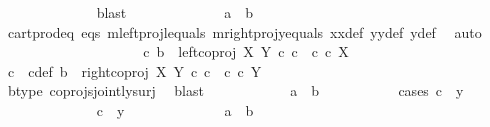 \begin{isabellebody}
\ \ \ \ \ \ \ \ \ \ \ \ \isamarkupfalse%
\ blast\isanewline
\ \ \ \ \ \ \ \ \ \ \isamarkupfalse%
\ \isamarkupfalse%
\ {\isachardoublequoteopen}a\ {\isacharequal}{\kern0pt}\ b{\isachardoublequoteclose}\isanewline
\ \ \ \ \ \ \ \ \ \ \ \ \isamarkupfalse%
\ cart{\isacharunderscore}{\kern0pt}prod{\isacharunderscore}{\kern0pt}eq{}\ eqs\ m{\isacharunderscore}{\kern0pt}leftproj{\isacharunderscore}{\kern0pt}l{\isacharunderscore}{\kern0pt}equals\ m{\isacharunderscore}{\kern0pt}rightproj{\isacharunderscore}{\kern0pt}y{\isacharunderscore}{\kern0pt}equals\ x{}x{}{\isacharunderscore}{\kern0pt}def{\isacharparenleft}{\kern0pt}{}{\isacharparenright}{\kern0pt}\ y{}y{}{\isacharunderscore}{\kern0pt}def\ y{\isacharunderscore}{\kern0pt}def\ \isamarkupfalse%
\ auto\isanewline
\ \ \ \ \ \ \ \ \isamarkupfalse%
\isanewline
\ \ \ \ \ \ \ \ \ \ \isamarkupfalse%
\ {\isachardoublequoteopen}{\isasymnexists}c{\isachardot}{\kern0pt}\ b\ {\isacharequal}{\kern0pt}\ left{\isacharunderscore}{\kern0pt}coproj\ X\ Y\ {\isasymcirc}\isactrlsub c\ c\ {\isasymand}\ c\ {\isasymin}\isactrlsub c\ X{\isachardoublequoteclose}\isanewline
\ \ \ \ \ \ \ \ \ \ \isamarkupfalse%
\ \isamarkupfalse%
\ c\ \ c{\isacharunderscore}{\kern0pt}def{\isacharcolon}{\kern0pt}\ {\isachardoublequoteopen}b\ {\isacharequal}{\kern0pt}\ right{\isacharunderscore}{\kern0pt}coproj\ X\ Y\ {\isasymcirc}\isactrlsub c\ c\ {\isasymand}\ c\ {\isasymin}\isactrlsub c\ Y{\isachardoublequoteclose}\isanewline
\ \ \ \ \ \ \ \ \ \ \ \ \isamarkupfalse%
\ b{\isacharunderscore}{\kern0pt}type\ coprojs{\isacharunderscore}{\kern0pt}jointly{\isacharunderscore}{\kern0pt}surj\ \isamarkupfalse%
\ blast\isanewline
\ \ \ \ \ \ \ \ \ \ \isamarkupfalse%
\ {\isachardoublequoteopen}a\ {\isacharequal}{\kern0pt}\ b{\isachardoublequoteclose}\isanewline
\ \ \ \ \ \ \ \ \ \ \isamarkupfalse%
{\isacharparenleft}{\kern0pt}cases\ {\isachardoublequoteopen}c\ {\isacharequal}{\kern0pt}\ y{\isachardoublequoteclose}{\isacharparenright}{\kern0pt}\isanewline
\ \ \ \ \ \ \ \ \ \ \ \ \isamarkupfalse%
\ {\isachardoublequoteopen}c\ {\isacharequal}{\kern0pt}\ y{\isachardoublequoteclose}\isanewline
\ \ \ \ \ \ \ \ \ \ \ \ \isamarkupfalse%
\ {\isachardoublequoteopen}a\ {\isacharequal}{\kern0pt}\ b{\isachardoublequoteclose}\isanewline
\ \ \ \ \ \ \ \ \ \ \ \ \ \ \isamarkupfalse%

\end{isabellebody}
